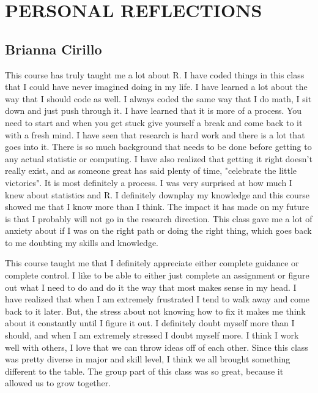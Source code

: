 \documentclass[12pt, letterpaper]{article}
\begin{document}
\pagebreak

\section{PERSONAL REFLECTIONS}
\subsection{Brianna Cirillo}
This course has truly taught me a lot about R. I have coded things in this class that I could have never imagined doing in my life. I have learned a lot about the way that I should code as well. I always coded the same way that I do math, I sit down and just push through it. I have learned that it is more of a process. You need to start and when you get stuck give yourself a break and come back to it with a fresh mind. I have seen that research is hard work and there is a lot that goes into it. There is so much background that needs to be done before getting to any actual statistic or computing. I have also realized that getting it right doesn't really exist, and as someone great has said plenty of time, "celebrate the little victories". It is most definitely a process. I was very surprised at how much I knew about statistics and R. I definitely downplay my knowledge and this course showed me that I know more than I think. The impact it has made on my future is that I probably will not go in the research direction. This class gave me a lot of anxiety about if I was on the right path or doing the right thing, which goes back to me doubting my skills and knowledge. 

This course taught me that I definitely appreciate either complete guidance or complete control. I like to be able to either just complete an assignment or figure out what I need to do and do it the way that most makes sense in my head. I have realized that when I am extremely frustrated I tend to walk away and come back to it later. But, the stress about not knowing how to fix it makes me think about it constantly until I figure it out. I definitely doubt myself more than I should, and when I am extremely stressed I doubt myself more. I think I work well with others, I love that we can throw ideas off of each other. Since this class was pretty diverse in major and skill level, I think we all brought something different to the table. The group part of this class was so great, because it  allowed us to grow together.
\end{document}
